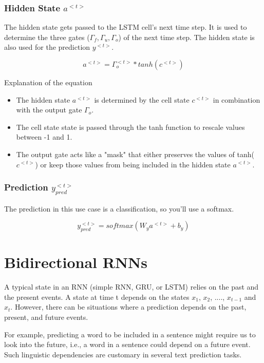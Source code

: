 \subsubsection{Hidden State $a^{<t>}$}
The hidden state gets passed to the LSTM cell's next time step. It is used to determine the three gates ($\Gamma _f , \Gamma _u , \Gamma _o $) of the next time step. The hidden state is also used for the prediction $y^{<t>}$.

\begin{equation}
    a^{<t>} = \Gamma _o ^{<t>} * tanh(c^{<t>})
\end{equation}

Explanation of the equation
\begin{itemize}
    \item The hidden state $a^{<t>}$
          is determined by the cell state $c^{<t>}$
          in combination with the output gate $\Gamma _o$.
    \item The cell state state is passed through the tanh function to rescale values between -1 and 1.
    \item The output gate acts like a "mask" that either preserves the values of tanh($c^{<t>}$) or keep those values from being included in the hidden state $a^{<t>}$.
\end{itemize}

\subsubsection{Prediction $y_{pred}^{<t>}$}
The prediction in this use case is a classification, so you'll use a softmax.

\begin{equation}
    y_{pred}^{<t>} = softmax(W_y a^{<t>} + b_y)
\end{equation}

\section{Bidirectional RNNs}
A typical state in an RNN (simple RNN, GRU, or LSTM) relies on the past and the present events. A state at time t depends on the states $x_1$, $x_2$, ...., $x_{t - 1}$ and $x_{t}$. However, there can be situations where a prediction depends on the past, present, and future events.

For example, predicting a word to be included in a sentence might require us to look into the future, i.e., a word in a sentence could depend on a future event. Such linguistic dependencies are customary in several text prediction tasks.  

